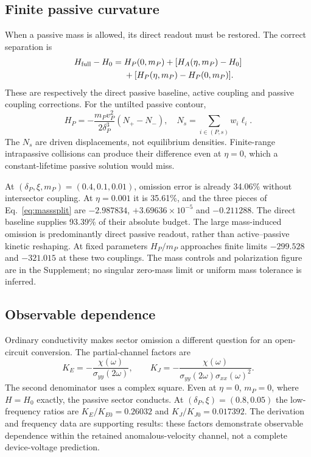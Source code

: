 \subsection{Finite passive curvature}
When a passive mass is allowed, its direct readout must be restored. The correct separation is
\begin{align}
H_{\rm full}-H_0={}&H_P(0,m_P)+[H_A(\eta,m_P)-H_0]\nonumber\\
&+[H_P(\eta,m_P)-H_P(0,m_P)].\label{eq:masssplit}
\end{align}
These are respectively the direct passive baseline, active coupling and passive coupling corrections. For the untilted passive contour,
\begin{equation}
H_P=-\frac{m_Pv_P^2}{2\delta_P^3}(N_+-N_-),\quad
N_s=\sum_{i\in(P,s)}w_i\ell_i.\label{eq:polarization}
\end{equation}
The $N_s$ are driven displacements, not equilibrium densities. Finite-range intrapassive collisions can produce their difference even at $\eta=0$, which a constant-lifetime passive solution would miss.

At $(\delta_P,\xi,m_P)=(0.4,0.1,0.01)$, omission error is already 34.06\% without intersector coupling. At $\eta=0.001$ it is 35.61\%, and the three pieces of Eq.~\eqref{eq:masssplit} are $-2.987834$, $+3.69636\times10^{-5}$ and $-0.211288$. The direct baseline supplies 93.39\% of their absolute budget. The large mass-induced omission is predominantly direct passive readout, rather than active--passive kinetic reshaping. At fixed parameters $H_P/m_P$ approaches finite limits $-299.528$ and $-321.015$ at these two couplings. The mass controls and polarization figure are in the Supplement; no singular zero-mass limit or uniform mass tolerance is inferred.

\subsection{Observable dependence}
Ordinary conductivity makes sector omission a different question for an open-circuit conversion. The partial-channel factors are
\begin{equation}
K_E=-\frac{\chi(\omega)}{\sigma_{yy}(2\omega)},\qquad
K_J=-\frac{\chi(\omega)}{\sigma_{yy}(2\omega)\sigma_{xx}(\omega)^2}.
\end{equation}
The second denominator uses a complex square. Even at $\eta=0$, $m_P=0$, where $H=H_0$ exactly, the passive sector conducts. At $(\delta_P,\xi)=(0.8,0.05)$ the low-frequency ratios are $K_E/K_{E0}=0.26032$ and $K_J/K_{J0}=0.017392$. The derivation and frequency data are supporting results: these factors demonstrate observable dependence within the retained anomalous-velocity channel, not a complete device-voltage prediction.
